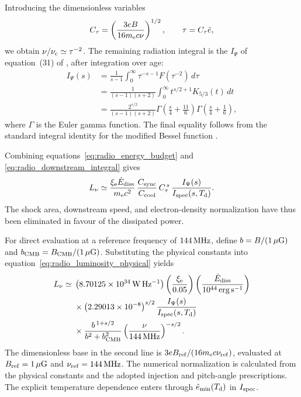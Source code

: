 Introducing the dimensionless variables
\begin{equation}
C_\tau=\left(\frac{3eB}{16m_{\rm e}c\nu}\right)^{1/2},
\qquad \tau=C_\tau\tilde e ,
\label{eq:radio_ctau}
\end{equation}
we obtain $\nu/\nu_{\rm c}\simeq\tau^{-2}$. The remaining
radiation integral is the $I_\Psi$ of equation~(31) of
\citet{HoeftBruggen2007}, after integration over age:
\begin{equation}
\begin{aligned}
I_\Psi(s)
&=\frac{1}{s-1}\int_0^\infty
\tau^{-s-1}F(\tau^{-2})\,d\tau\\
&=\frac{1}{(s-1)(s+2)}
\int_0^\infty t^{s/2+1}K_{5/3}(t)\,dt\\
&=\frac{2^{s/2}}{(s-1)(s+2)}
\Gamma\!\left(\frac{s}{4}+\frac{11}{6}\right)
\Gamma\!\left(\frac{s}{4}+\frac{1}{6}\right),
\end{aligned}
\label{eq:radio_ipsi}
\end{equation}
where $\Gamma$ is the Euler gamma function. The final equality follows from the standard integral identity for the modified Bessel function
\citep[Eq.~10.43.19]{olver_nist_2010}.

Combining equations~\eqref{eq:radio_energy_budget} and
\eqref{eq:radio_downstream_integral} gives
\begin{equation}
L_\nu\simeq
\frac{\xi_{\rm e}\dot{E}_{\rm diss}}{m_{\rm e}c^{2}}\,
\frac{C_{\rm sync}}{C_{\rm cool}}\,
C_\tau^{\,s}\,
\frac{I_\Psi(s)}{I_{\rm spec}(s,T_{\rm d})}.
\label{eq:radio_luminosity_physical}
\end{equation}
The shock area, downstream speed, and electron-density
normalization have thus been eliminated in favour of the
dissipated power.

For direct evaluation at a reference frequency of $144\,{\rm MHz}$,
define $b=B/(1\,\mu{\rm G})$ and
$b_{\rm CMB}=B_{\rm CMB}/(1\,\mu{\rm G})$.
Substituting the physical constants into
equation~\eqref{eq:radio_luminosity_physical} yields
\begin{equation}
\begin{aligned}
L_\nu\simeq{}&
\left(8.70125\times10^{34}\,
{\rm W\,Hz^{-1}}\right)
\left(\frac{\xi_{\rm e}}{0.05}\right)
\left(\frac{\dot{E}_{\rm diss}}
{10^{44}\,{\rm erg\,s^{-1}}}\right)\\
&\times
\left(2.29013\times10^{-8}\right)^{s/2}
\frac{I_\Psi(s)}{I_{\rm spec}(s,T_{\rm d})}\\
&\times
\frac{b^{\,1+s/2}}{b^{2}+b_{\rm CMB}^{2}}
\left(\frac{\nu}{144\,{\rm MHz}}\right)^{-s/2}.
\end{aligned}
\label{eq:radio_luminosity_144}
\end{equation}
The dimensionless base in the second line is
$3eB_{\rm ref}/(16m_{\rm e}c\nu_{\rm ref})$, evaluated at
$B_{\rm ref}=1\,\mu{\rm G}$ and
$\nu_{\rm ref}=144\,{\rm MHz}$.
The numerical normalization is calculated from the physical
constants and the adopted injection and pitch-angle
prescriptions. The explicit temperature dependence enters through
$\tilde e_{\min}(T_{\rm d})$ in $I_{\rm spec}$.

